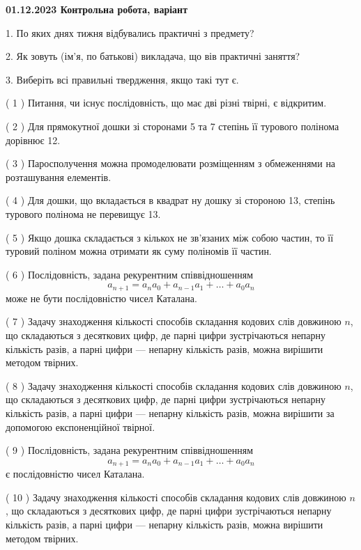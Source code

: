 \documentclass[12pt, ukrainian]{article}
\begin{document}
\vspace{4mm}
\newpage
\begin {large}

\textbf{01.12.2023 Контрольна робота, варіант  }\par


{
1. По яких днях тижня відбувались практичні з предмету?



\vspace{5mm}
2. Як зовуть (ім'я, по батькові) викладача, що вів практичні заняття?



\vspace{5mm}
3. Виберіть всі правильні твердження, якщо такі тут є.\par
\vspace{2mm}
( 1 ) Питання, чи існує послідовність, що має дві різні твірні, є відкритим.%

( 2 ) Для прямокутної дошки зі сторонами 5 та 7 степінь її турового полінома дорівнює 12.%

( 3 ) Паросполучення можна промоделювати розміщенням з обмеженнями на розташування елементів.%

( 4 ) Для дошки, що вкладається в квадрат ну дошку зі стороною 13, степінь турового полінома не перевищує 13.%

( 5 ) Якщо дошка складається з кількох не зв’язаних між собою частин, то її туровий поліном можна отримати як суму поліномів її частин.%

( 6 ) Послідовність, задана рекурентним співвідношенням $$a_{n+1}=a_{n}a_{0}+a_{n-1}a_{1}+\ldots+a_0a_{n}$$ може не бути послідовністю чисел Каталана.%

( 7 ) Задачу знаходження кількості способів складання кодових слів довжиною $n$, що складаються з десяткових цифр, де парні цифри зустрічаються непарну кількість разів, а парні цифри — непарну кількість разів, можна вирішити методом твірних.%

( 8 ) Задачу знаходження кількості способів складання кодових слів довжиною $n$, що складаються з десяткових цифр, де парні цифри зустрічаються непарну кількість разів, а парні цифри — непарну кількість разів, можна вирішити за допомогою експоненційної твірної.%

( 9 ) Послідовність, задана рекурентним співвідношенням $$a_{n+1}=a_{n}a_{0}+a_{n-1}a_{1}+\ldots+a_0a_{n}$$ є послідовністю чисел Каталана.%

( 10 ) Задачу знаходження кількості способів складання кодових слів довжиною $n$, що складаються з десяткових цифр, де парні цифри зустрічаються непарну кількість разів, а парні цифри — непарну кількість разів, можна вирішити методом твірних.%
}
\end {large}
\end{document}
